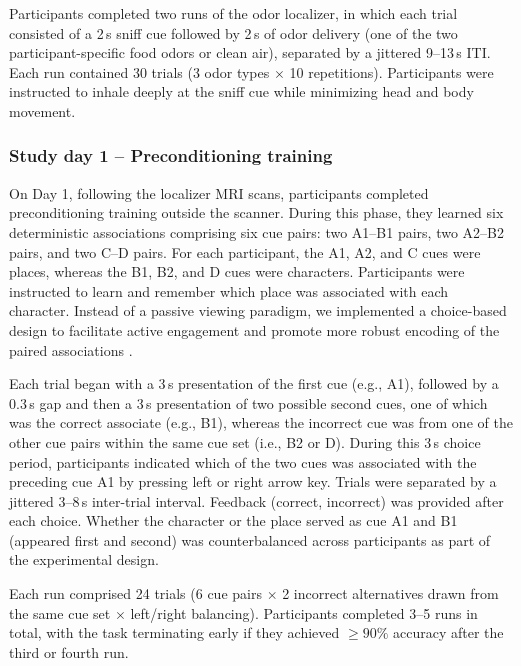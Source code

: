 \documentclass[12pt,letterpaper]{article}
\begin{document}
Participants completed two runs of the odor localizer, in which each trial consisted of a 2\,s sniff cue followed by 2\,s of odor delivery (one of the two participant-specific food odors or clean air), separated by a jittered 9--13\,s ITI. Each run contained 30 trials (3 odor types $\times$ 10 repetitions). Participants were instructed to inhale deeply at the sniff cue while minimizing head and body movement.






\subsubsection*{Study day 1 – Preconditioning training}

On Day 1, following the localizer MRI scans, participants completed preconditioning training outside the scanner. During this phase, they learned six deterministic associations comprising six cue pairs: two A1–B1 pairs, two A2–B2 pairs, and two C–D pairs. For each participant, the A1, A2, and C cues were places, whereas the B1, B2, and D cues were characters. Participants were instructed to learn and remember which place was associated with each character. Instead of a passive viewing paradigm, we implemented a choice-based design to facilitate active engagement and promote more robust encoding of the paired associations \cite{bunsey1996conservation}.


Each trial began with a 3\,s presentation of the first cue (e.g., A1), followed by a 0.3\,s gap and then a 3\,s presentation of two possible second cues, one of which was the correct associate (e.g., B1), whereas the incorrect cue was from one of the other cue pairs within the same cue set (i.e., B2 or D). During this 3\,s choice period, participants indicated which of the two cues was associated with the preceding cue A1 by pressing left or right arrow key. Trials were separated by a jittered 3–8\,s inter-trial interval. Feedback (correct, incorrect) was provided after each choice. Whether the character or the place served as cue A1 and B1 (appeared first and second) was counterbalanced across participants as part of the experimental design.


Each run comprised 24 trials (6 cue pairs $\times$ 2 incorrect alternatives drawn from the same cue set $\times$ left/right balancing). Participants completed 3--5 runs in total, with the task terminating early if they achieved $\geq 90\%$ accuracy after the third or fourth run.
\end{document}
